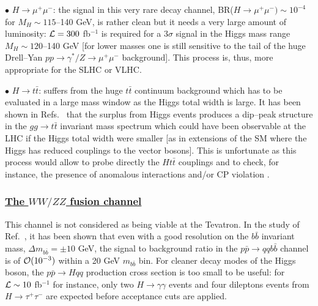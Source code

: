 $\bullet$ \underline{$H \to \mu^+ \mu^-$}: the signal in this very rare decay
channel, BR($H \to \mu^+\mu^-) \sim 10^{-4}$ for $M_H \sim 115$--140 GeV,  
is rather clean but it needs a very large amount of luminosity: ${\cal L}= 300$
fb$^{-1}$ is required for a 3$\sigma$ signal in the Higgs mass range $M_H \sim 
120$--140 GeV \cite{pp-ggH-mu} [for lower masses one is still sensitive to the
tail of the huge Drell--Yan $pp \to \gamma^*/Z \to \mu^+ \mu^-$ background]. 
This process is, thus, more appropriate for the SLHC or VLHC.\s 

$\bullet$ \underline{$H \to t\bar t$}: suffers from the huge $t\bar t$
continuum background which has to be evaluated in a large mass window as the
Higgs total width is large. It has been shown in
Refs.~\cite{pp-Htt-gg,pp-Htt-ggA} that the surplus from Higgs events produces a
dip--peak structure in the $gg \to t\bar t$ invariant mass spectrum which could
have been observable at the LHC if the Higgs total width were smaller [as in
extensions of the SM where the Higgs has reduced couplings to the vector
bosons]. This is unfortunate as this process would allow to probe directly the
$Ht\bar t$ couplings and to check, for instance, the presence of anomalous
interactions and/or CP violation \cite{CPHttpol,CPHttpolA}.

\subsubsection*{\underline{The $WW/ZZ$ fusion channel}}

This channel is not considered as being viable at the Tevatron. In the study of
Ref.~\cite{Higgs-TeV}, it has been shown that even with a good resolution on
the  $b\bar b$ invariant mass, $\Delta m_{b\bar b} = \pm 10$ GeV, the signal to
background ratio in the $p\bar p \to  qq b \bar b$ channel is of ${\cal
O}(10^{-3})$ within a 20 GeV $m_{b\bar b}$ bin. For cleaner decay modes of the
Higgs boson, the $p\bar p \to Hqq$ production cross section is too small to be
useful: for ${\cal L}\sim 10$ fb$^{-1}$ for instance, only two $H \to \gamma
\gamma$ events and four dileptons events from $H \to \tau^+ \tau^-$ are
expected before acceptance cuts are applied. \s

